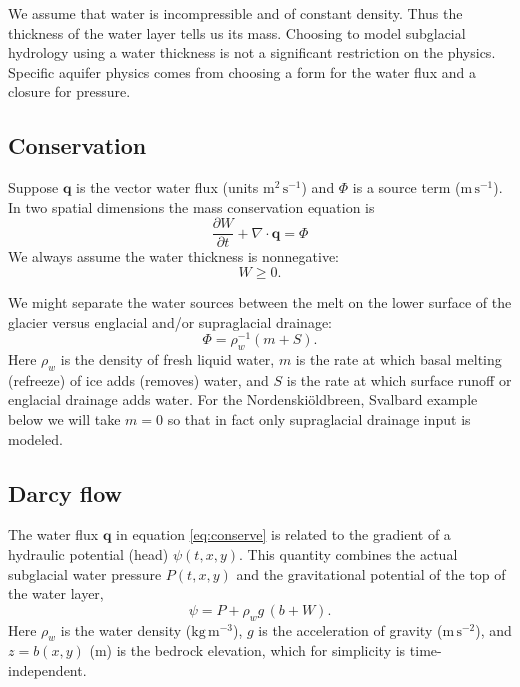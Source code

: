 \documentclass[11pt,final]{amsart}%
\newcommand\bq{\mathbf{q}}
\newcommand{\Div}{\nabla\cdot}
\newcommand{\Nbreen}{Nordenski\"oldbreen\xspace}
\begin{document}
We assume that water is incompressible and of constant density.  Thus the thickness of the water layer tells us its mass.  Choosing to model subglacial hydrology using a water thickness is not a significant restriction on the physics.  Specific aquifer physics comes from choosing a form for the water flux and a closure for pressure.

\subsection*{Conservation}  Suppose $\bq$ is the vector water flux (units $\text{m}^2\,\text{s}^{-1}$) and $\Phi$ is a source term ($\text{m}\,\text{s}^{-1}$).  In two spatial dimensions the mass conservation equation is \citep{Clarke05}
\begin{equation} \label{eq:conserve}
\frac{\partial W}{\partial t} + \Div \bq = \Phi
\end{equation}
We always assume the water thickness is nonnegative:
\begin{equation}
W \ge 0.
\end{equation}

We might separate the water sources between the melt on the lower surface of the glacier versus englacial and/or supraglacial drainage:
\begin{equation}
\Phi = \rho_w^{-1} \left(m + S\right).  \label{drainagesplit}
\end{equation}
Here $\rho_w$ is the density of fresh liquid water, $m$ is the rate at which basal melting (refreeze) of ice adds (removes) water, and $S$ is the rate at which surface runoff or englacial drainage adds water.  For the \Nbreen, Svalbard example below we will take $m=0$ so that in fact only supraglacial drainage input is modeled.

\subsection*{Darcy flow}  The water flux $\bq$ in equation \eqref{eq:conserve} is related to the gradient of a hydraulic potential (head) $\psi(t,x,y)$.  This quantity combines the actual subglacial water pressure $P(t,x,y)$ and the gravitational potential of the top of the water layer,
\begin{equation} \label{eq:potential}
\psi = P + \rho_w g\, (b+W).
\end{equation}
Here $\rho_w$ is the water density ($\text{kg}\,\text{m}^{-3}$), $g$ is the acceleration of gravity ($\text{m}\,\text{s}^{-2}$), and $z=b(x,y)$ ($\text{m}$) is the bedrock elevation, which for simplicity is time-independent.
\end{document}

